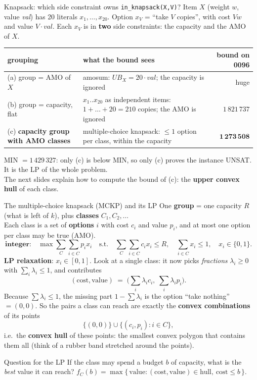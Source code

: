 \documentclass[aspectratio=169,11pt]{beamer}
\begin{document}
\begin{frame}{Knapsack: which side constraint owns \texttt{in\_knapsack(X,V)}?}
\footnotesize
Item $X$ (weight $w$, value \textit{val}) has 20 literals $x_1,\dots,x_{20}$. Option $x_V$ = ``take $V$ copies'', with
cost $V w$ and value $V\cdot\textit{val}$. Each $x_V$ is in \textbf{two} side constraints: the capacity and the AMO of $X$.
\vspace{2mm}
\begin{center}
\begin{tabular}{p{38mm}p{62mm}r}\toprule
grouping & what the bound sees & bound on 0096\\\midrule
(a) group = AMO of $X$ & amosum: $UB_X = 20\cdot\textit{val}$; the capacity is ignored & huge\\
(b) group = capacity, flat & $x_1..x_{20}$ as independent items: $1{+}\dots{+}20 = 210$ copies; the AMO is ignored & $1\,821\,737$\\
(c) \textbf{capacity group with AMO classes} & multiple-choice knapsack: $\le 1$ option per class, within the capacity & $\mathbf{1\,273\,508}$\\\bottomrule
\end{tabular}
\end{center}
\vspace{2mm}
MIN $= 1\,429\,327$: only (c) is below MIN, so only (c) proves the instance UNSAT. It is the LP of the whole problem.\\[2mm]
The next slides explain how to compute the bound of (c): the \textbf{upper convex hull} of each class.
\end{frame}

\begin{frame}{The multiple-choice knapsack (MCKP) and its LP}
\footnotesize
One \textbf{group} = one capacity $R$ (what is left of $k$), plus \textbf{classes} $C_1, C_2, \dots$\\
Each class is a set of \textbf{options} $i$ with cost $c_i$ and value $p_i$, and at most one option per class may be true (AMO).
\[
\textbf{integer:}\quad \max \sum_{C}\sum_{i \in C} p_i x_i \quad\text{s.t.}\quad \sum_C\sum_{i\in C} c_i x_i \le R,\quad
\sum_{i \in C} x_i \le 1,\quad x_i \in \{0,1\}.
\]
\textbf{LP relaxation}: $x_i \in [0,1]$. Look at a single class: it now picks \emph{fractions} $\lambda_i \ge 0$ with
$\sum_i \lambda_i \le 1$, and contributes
\[
(\text{cost}, \text{value}) \;=\; \Big(\sum_i \lambda_i c_i,\; \sum_i \lambda_i p_i\Big).
\]
Because $\sum\lambda_i \le 1$, the missing part $1 - \sum\lambda_i$ is the option ``take nothing'' $= (0,0)$.
So the pairs a class can reach are exactly the \textbf{convex combinations} of its points
\[
\{(0,0)\} \cup \{(c_i, p_i) : i \in C\},
\]
i.e.\ the \textbf{convex hull} of these points: the smallest convex polygon that contains them all
(think of a rubber band stretched around the points).
\vspace{1mm}
\begin{block}{Question for the LP}
If the class may spend a budget $b$ of capacity, what is the \emph{best} value it can reach?\quad
$f_C(b) = \max\{\,\text{value} : (\text{cost},\text{value}) \in \text{hull},\ \text{cost} \le b\,\}$.
\end{block}
\end{frame}
\end{document}
